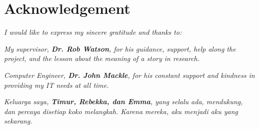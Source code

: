 \newpage
\centering
\section*{Acknowledgement} 

\vspace{6cm}
\textit{I would like to express my sincere gratitude and thanks to:}

\vspace{1cm}

\textit{My supervisor, \textbf{Dr. Rob Watson}, for his guidance, support, help along the project, and the lesson about the meaning of a story in research.}

\textit{Computer Engineer, \textbf{Dr. John Mackle}, for his constant support and kindness in providing my IT needs at all time.}

\textit{Keluarga saya, \textbf{Timur, Rebekka, dan Emma}, yang selalu ada, mendukung, dan percaya disetiap koko melangkah. Karena mereka, aku menjadi aku yang sekarang.}





